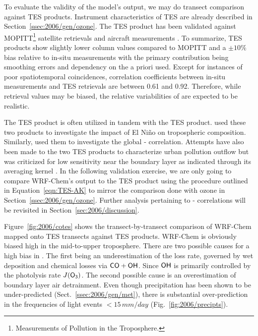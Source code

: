 To evaluate the validity of the model's  output, we may do transect comparison against TES  products. Instrument characteristics of TES are
already described in Section~\ref{ssec:2006/gen/ozone}. The TES  product has been validated against MOPITT\footnote{Measurements of Pollution in
the Troposphere.} satellite retrievals \citep{Luo:2007ly,Ho:2009lh} and aircraft measurements \citep{Luo:2007vn,Lopez:2008ys}. To summarize, TES 
products show slightly lower column  values compared to MOPITT and a $\pm10\%$ bias relative to in-situ measurements with
the primary contribution being smoothing errors and dependency on the a priori used. Except for instances of poor spatiotemporal coincidences, correlation
coefficients between in-situ measurements and TES retrievals are between 0.61 and 0.92. Therefore, while retrieval values may be biased, the relative variabilities
of   are expected to be realistic.

The TES  product is often utilized in tandem with the TES  product. \citet{Logan:2008uq} used these two products to investigate the impact
of El Ni\~no on tropospheric composition. Similarly, \citet{Voulgarakis:2011fk} used them to investigate the global - correlation. Attempts
have also been made to the two TES products to characterize urban pollution outflow but was criticized for low sensitivity near the boundary layer as indicated
through its averaging kernel \citep{Shim:2007kx}. In the following validation exercise, we are only going to compare WRF-Chem's output to the TES 
product using the procedure outlined in Equation~\ref{eqn:TES-AK} to mirror the comparison done with ozone in Section~\ref{ssec:2006/gen/ozone}.  Further
analysis pertaining to - correlations will be revisited in Section~\ref{sec:2006/discussion}.

	
Figure~\ref{fig:2006/cotes} shows the transect-by-transect comparison of WRF-Chem  mapped onto TES transects against TES 
products. WRF-Chem is obviously biased high in the mid-to-upper troposphere. There are two possible causes for a high bias in . The first being an
underestimation of the loss rate, governed by wet deposition and chemical losses via $\chem{CO}+\chem{OH}$. Since $\chem{OH}$ is primarily controlled by
the photolysis rate $J(\chem{O_3})$. The second possible cause is an overestimation of boundary layer air detrainment. Even though precipitation has been shown to be
under-predicted (Sect.~\ref{ssec:2006/gen/met}), there is substantial over-prediction in the frequencies of light events $<15\,\unit{mm/day}$ (Fig.~\ref{fig:2006/precipts}).


